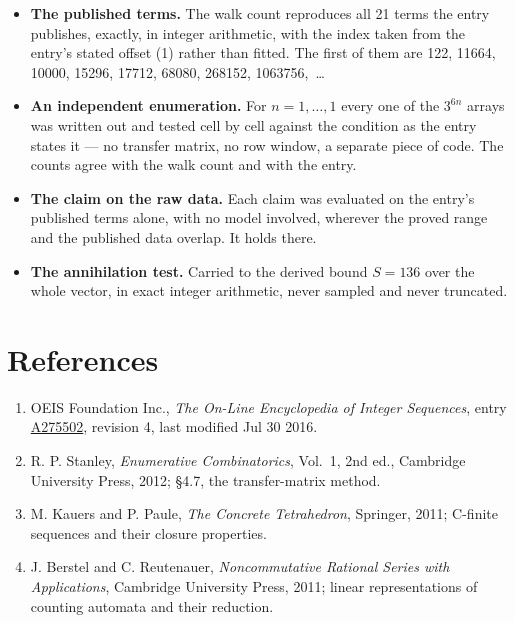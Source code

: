 \documentclass[11pt]{article}
\theoremstyle{definition}
\begin{document}
\begin{itemize}

\item {\bfseries The published terms.} The walk count reproduces all 21 terms the entry publishes, exactly, in integer arithmetic, with the index taken from the entry's stated offset (1) rather than fitted. The first of them are 122, 11664, 10000, 15296, 17712, 68080, 268152, 1063756,~\dots

\item {\bfseries An independent enumeration.} For $n = 1,\dots,1$ every one of the $3^{6n}$ arrays was written out and tested cell by cell against the condition as the entry states it --- no transfer matrix, no row window, a separate piece of code. The counts agree with the walk count and with the entry.

\item {\bfseries The claim on the raw data.} Each claim was evaluated on the entry's published terms alone, with no model involved, wherever the proved range and the published data overlap. It holds there.

\item {\bfseries The annihilation test.} Carried to the derived bound $S = 136$ over the whole vector, in exact integer arithmetic, never sampled and never truncated.

\end{itemize}

\section{References}

\begin{enumerate}

\item OEIS Foundation Inc., \emph{The On-Line Encyclopedia of Integer Sequences}, entry \href{https://oeis.org/A275502}{A275502}, revision 4, last modified Jul 30 2016.

\item R. P. Stanley, \emph{Enumerative Combinatorics}, Vol.~1, 2nd ed., Cambridge University Press, 2012; \S4.7, the transfer-matrix method.

\item M. Kauers and P. Paule, \emph{The Concrete Tetrahedron}, Springer, 2011; C-finite sequences and their closure properties.

\item J. Berstel and C. Reutenauer, \emph{Noncommutative Rational Series with Applications}, Cambridge University Press, 2011; linear representations of counting automata and their reduction.

\end{enumerate}
\end{document}
